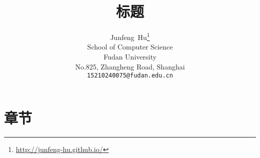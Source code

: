 \documentclass[]{article}
\title{标题}
\author{
	Junfeng~Hu\thanks{ \url{http://junfeng-hu.github.io/}} \\
	School of Computer Science\\
	Fudan University\\
	No.825, Zhangheng Road, Shanghai \\
	\texttt{15210240075@fudan.edu.cn} \\
}
\begin{document}
\maketitle



\section{章节}
\end{document}
